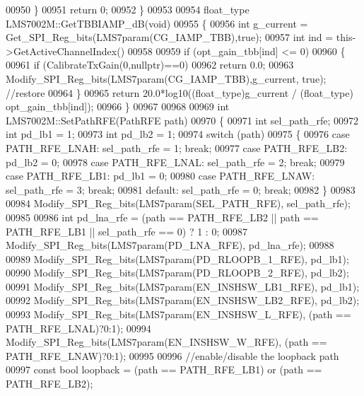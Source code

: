 \begin{DoxyCode}
{{{{{{{{{{{{{{{{{{{{{{{{{00950     \}
00951     \textcolor{keywordflow}{return} 0;
00952 \}
00953 
00954 float_type LMS7002M::GetTBBIAMP_dB(\textcolor{keywordtype}{void})
00955 \{
00956     \textcolor{keywordtype}{int} g\_current = Get_SPI_Reg_bits(LMS7param(CG_IAMP_TBB),\textcolor{keyword}{true});
00957     \textcolor{keywordtype}{int} ind = this->GetActiveChannelIndex()%
00958 
00959     \textcolor{keywordflow}{if} (opt_gain_tbb[ind] <= 0)
00960     \{
00961         \textcolor{keywordflow}{if} (CalibrateTxGain(0,\textcolor{keyword}{nullptr})==0)
00962             \textcolor{keywordflow}{return} 0.0;
00963         Modify_SPI_Reg_bits(LMS7param(CG_IAMP_TBB),g\_current, \textcolor{keyword}{true}); \textcolor{comment}{//restore}
00964     \}
00965     \textcolor{keywordflow}{return} 20.0*log10((float_type)g\_current / (float_type) opt_gain_tbb[ind]);
00966 \}
00967 
00968 
00969 \textcolor{keywordtype}{int} LMS7002M::SetPathRFE(PathRFE path)
00970 \{
00971     \textcolor{keywordtype}{int} sel\_path\_rfe;
00972     \textcolor{keywordtype}{int} pd\_lb1 = 1;
00973     \textcolor{keywordtype}{int} pd\_lb2 = 1;
00974     \textcolor{keywordflow}{switch} (path)
00975     \{
00976         \textcolor{keywordflow}{case} PATH_RFE_LNAH: sel\_path\_rfe = 1; \textcolor{keywordflow}{break};
00977         \textcolor{keywordflow}{case} PATH_RFE_LB2: pd\_lb2 = 0;
00978         \textcolor{keywordflow}{case} PATH_RFE_LNAL: sel\_path\_rfe = 2; \textcolor{keywordflow}{break};
00979         \textcolor{keywordflow}{case} PATH_RFE_LB1: pd\_lb1 = 0;
00980         \textcolor{keywordflow}{case} PATH_RFE_LNAW: sel\_path\_rfe = 3; \textcolor{keywordflow}{break};
00981         \textcolor{keywordflow}{default}: sel\_path\_rfe = 0; \textcolor{keywordflow}{break};
00982     \}
00983 
00984     Modify_SPI_Reg_bits(LMS7param(SEL_PATH_RFE), sel\_path\_rfe);
00985 
00986     \textcolor{keywordtype}{int} pd\_lna\_rfe = (path == PATH_RFE_LB2 || path == PATH_RFE_LB1 || sel\_path\_rfe == 0) ? 1 : 0;
00987     Modify_SPI_Reg_bits(LMS7param(PD_LNA_RFE), pd\_lna\_rfe);
00988 
00989     Modify_SPI_Reg_bits(LMS7param(PD_RLOOPB_1_RFE), pd\_lb1);
00990     Modify_SPI_Reg_bits(LMS7param(PD_RLOOPB_2_RFE), pd\_lb2);
00991     Modify_SPI_Reg_bits(LMS7param(EN_INSHSW_LB1_RFE), pd\_lb1);
00992     Modify_SPI_Reg_bits(LMS7param(EN_INSHSW_LB2_RFE), pd\_lb2);
00993     Modify_SPI_Reg_bits(LMS7param(EN_INSHSW_L_RFE), (path == PATH_RFE_LNAL)?0:1);
00994     Modify_SPI_Reg_bits(LMS7param(EN_INSHSW_W_RFE), (path == PATH_RFE_LNAW)?0:1);
00995 
00996     \textcolor{comment}{//enable/disable the loopback path}
00997     \textcolor{keyword}{const} \textcolor{keywordtype}{bool} loopback = (path == PATH_RFE_LB1) or (path == PATH_RFE_LB2);
}}}}}}}}}}}}}}}}}}}}}}}}}
\end{DoxyCode}
